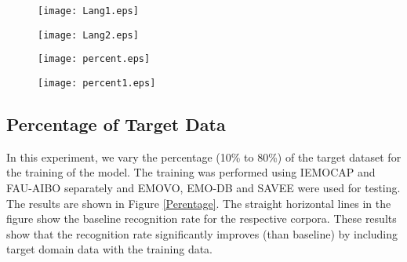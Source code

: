 \documentclass[a4paper]{article}
\begin{document}
\begin{figure*}[!ht]%
\centering
\begin{subfigure}{0.4\linewidth}
\texttt{[image: Lang1.eps]}%
\captionsetup{justification=centering}
\caption{}%
\label{Lang1}%
\end{subfigure}%
\begin{subfigure}{0.4\linewidth}
\texttt{[image: Lang2.eps]}%
\captionsetup{justification=centering}
\caption{} %
\label{lang2}%
\end{subfigure}%
\caption{Comparison of language tests using DBN and sparse AE. Figure \ref{Lang1} represents the recognition rate using IEMOCAP (English) for training and other databases for testing whereas \ref{lang2} shows the recognition rate using FAU-AIBO (German) for training and other databases for testing.}
\label{fig:Lang}
\end{figure*}

\begin{figure*}[!ht]%
\centering
\begin{subfigure}{0.4\linewidth}
\texttt{[image: percent.eps]}%
\captionsetup{justification=centering}
\caption{}%
\label{Per1}%
\end{subfigure}%
\begin{subfigure}{0.4\linewidth}
\texttt{[image: percent1.eps]}%
\captionsetup{justification=centering}
\caption{} %
\label{Per2}%
\end{subfigure}%
\caption{Impact of using a percentage of target date with training data. Where \ref{Per1} shows the training with IEMOCAP and \ref{Per2} is when training is performed using FAU-AIBO.}
\label{Perentage}
\end{figure*}


\subsection{Percentage of Target Data}

In this experiment, we vary the percentage (10\% to 80\%) of the target dataset for the training of the model. The training was performed using IEMOCAP and FAU-AIBO separately and EMOVO, EMO-DB and SAVEE were used for testing. The results are shown in Figure \ref{Perentage}. The straight horizontal lines in the figure show the baseline recognition rate for the respective corpora. These results show that the recognition rate significantly improves (than baseline) by including target domain data with the training data.
\end{document}
